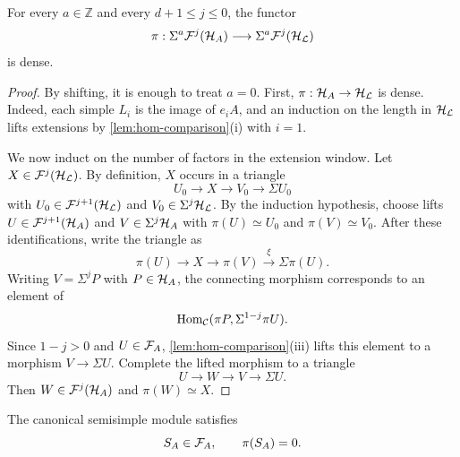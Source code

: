 \documentclass[11pt,a4paper,dvipsnames,x11names]{amsart}
\begin{document}
\begin{lem}\label{lem:density}
For every $a\in\mathbb Z$ and every $d+1\leq j\leq0$, the functor
\[
\pi:\Sigma^a\mathcal F^j(\mathcal H_A)\longrightarrow\Sigma^a\mathcal F^j(\mathcal H_{\mathcal L})
\]
is dense.
\end{lem}

\begin{proof}
    By shifting, it is enough to treat $a=0$. First, $\pi:\mathcal H_A\to\mathcal H_{\mathcal L}$ is dense. Indeed, each simple $L_i$ is the image of $e_iA$, and an induction on the length in $\mathcal H_{\mathcal L}$ lifts extensions by \cref{lem:hom-comparison}(i) with $i=1$.

    We now induct on the number of factors in the extension window. Let $X\in\mathcal F^j(\mathcal H_{\mathcal L})$. By definition, $X$ occurs in a triangle
    \[
    U_0\longrightarrow X\longrightarrow V_0\longrightarrow\Sigma U_0
    \]
    with $U_0\in\mathcal F^{j+1}(\mathcal H_{\mathcal L})$ and $V_0\in\Sigma^j\mathcal H_{\mathcal L}$. By the induction hypothesis, choose lifts $U\in\mathcal F^{j+1}(\mathcal H_A)$ and $V\in\Sigma^j\mathcal H_A$ with $\pi(U)\simeq U_0$ and $\pi(V)\simeq V_0$. After these identifications, write the triangle as
    \[
    \pi(U)\longrightarrow X\longrightarrow \pi(V)\xrightarrow{\xi}\Sigma\pi(U).
    \]
    Writing $V=\Sigma^jP$ with $P\in\mathcal H_A$, the connecting morphism corresponds to an element of
    \[
    \operatorname{Hom}_{\mathcal C}(\pi P,\Sigma^{1-j}\pi U).
    \]
    Since $1-j>0$ and $U\in\mathcal F_A$, \cref{lem:hom-comparison}(iii) lifts this element to a morphism $V\to\Sigma U$. Complete the lifted morphism to a triangle
    \[
    U\longrightarrow W\longrightarrow V\longrightarrow\Sigma U.
    \]
    Then $W\in\mathcal F^j(\mathcal H_A)$ and $\pi(W)\simeq X$.
\end{proof}

\begin{lem}\label{lem:construct-SA}
The canonical semisimple module satisfies
\[
S_A\in\mathcal F_A,\qquad \pi(S_A)=0.
\]
\end{lem}
\end{document}
